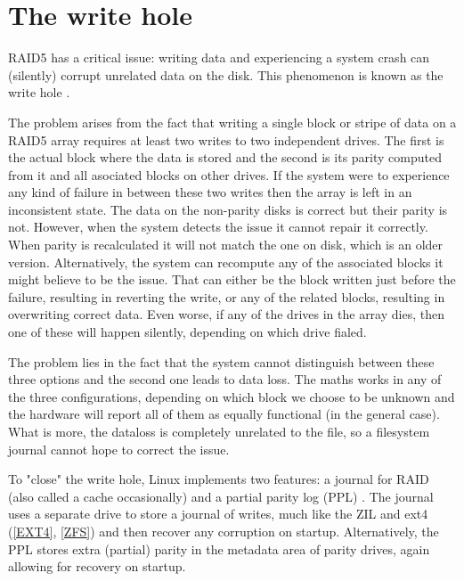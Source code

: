     \section{The write hole}

        RAID5 has a critical issue: writing data and experiencing a system
        crash can (silently) corrupt unrelated data on the disk. This
        phenomenon is known as the write hole \cite{LWN_md_journal}.

        The problem arises from the fact that writing a single block or stripe
        of data on a RAID5 array requires at least two writes to two
        independent drives. The first is the actual block where the data is
        stored and the second is its parity computed from it and all asociated
        blocks on other drives. If the system were to experience any kind of
        failure in between these two writes then the array is left in an
        inconsistent state. The data on the non-parity disks is correct but
        their parity is not. However, when the system detects the issue it
        cannot repair it correctly. When parity is recalculated it will not
        match the one on disk, which is an older version. Alternatively, the
        system can recompute any of the associated blocks it might believe to
        be the issue. That can either be the block written just before the
        failure, resulting in reverting the write, or any of the related
        blocks, resulting in overwriting correct data. Even worse, if any of
        the drives in the array dies, then one of these will happen silently,
        depending on which drive fialed.

        The problem lies in the fact that the system cannot distinguish between
        these three options and the second one leads to data loss. The maths
        works in any of the three configurations, depending on which block we
        choose to be unknown and the hardware will report all of them as
        equally functional (in the general case). What is more, the dataloss is
        completely unrelated to the file, so a filesystem journal cannot hope
        to correct the issue.

        To "close" the write hole, Linux implements two features: a journal for
        RAID \cite{LWN_md_journal} (also called a cache occasionally) and a
        partial parity log (PPL)
        \cite{PPL: https://www.kernel.org/doc/html/latest/driver-api/md/raid5-ppl.html}.
        The journal uses a separate drive to store a journal of writes, much
        like the ZIL and ext4 (\ref{EXT4}, \ref{ZFS}) and then recover any
        corruption on startup. Alternatively, the PPL stores extra (partial)
        parity in the metadata area of parity drives, again allowing for
        recovery on startup.

